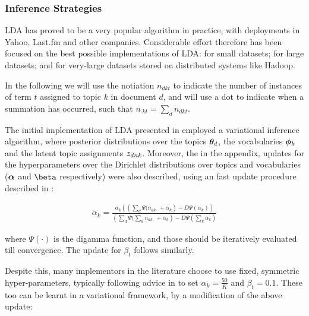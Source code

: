

\subsubsection{Inference Strategies}
LDA has proved to be a very popular algorithm in practice, with deployments in Yahoo, Last.fm and other companies. Considerable effort therefore has been focused on the best possible implementations of LDA: for small datasets; for large datasets; and for very-large datasets stored on distributed systems like Hadoop.

In the following we will use the notiation $n_{dkt}$ to indicate the number of instances of term $t$ assigned to topic $k$ in document $d$, and will use a dot to indicate when a summation has occurred, such that $n_{\cdot k t} = \sum_d n_{dkt}$.



The initial implementation of LDA presented in \cite{BleiNgJordan2003} employed a variational inference algorithm, where posterior distributions over the topics ${ \bm \theta_d }$, the vocabularies ${ \bm \phi_k }$ and the latent topic assignments ${ z_{dnk} }$. Moreover, the in the appendix, updates for the hyperparameters over the Dirichlet distributions over topics and vocabularies ($\bm \alpha$ and $\vv{\beta}$ respectively) were also described, using an fast update procedure described in \cite{Minka2000}:

\begin{align}
\alpha_k = \frac{\alpha_k \left( \left(\sum_d \Psi(n_{dk\cdot} + \alpha_k \right) - D \Psi (\alpha_k)\right)}{\left(\sum_d  \Psi(\sum_k n_{dk\cdot} + \alpha_k \right) - D \Psi (\sum_k \alpha_k)}
\end{align}

where $\Psi(\cdot)$ is the digamma function, and those should be iteratively evaluated till convergence. The update for $\beta_t$ follows similarly.

Despite this, many implementors in the literature choose to use fixed, symmetric hyper-parameters, typically following advice in \cite{Griffiths2004} to set $\alpha_k = \frac{50}{K}$ and $\beta_t=0.1$. These too can be learnt in a variational framework, by a modification of the above update\cite{Heinrich2005}:

